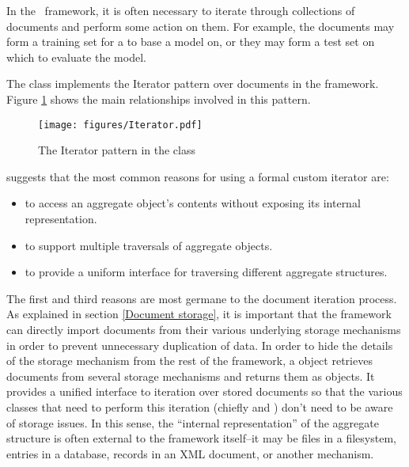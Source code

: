 In the \aicat\ framework, it is often necessary to iterate
through collections of documents and perform some action on them.  For
example, the documents may form a training set for a  to base a
model on, or they may form a test set on which to evaluate the model.

The  class implements the Iterator pattern
\cite[p. 257]{gamma:95} over documents in the framework.  Figure
\ref{Iterator-collection} shows the main relationships involved in
this pattern.

\begin{figure}
\texttt{[image: figures/Iterator.pdf]}
\caption{The Iterator pattern in the  class}
\label{Iterator-collection}
\end{figure}


\cite[p. 259]{gamma:95} suggests that the most common reasons for
using a formal custom iterator are:

\begin{itemize}

\item to access an aggregate object's contents without exposing its
internal representation.

\item to support multiple traversals of aggregate objects.

\item to provide a uniform interface for traversing different
aggregate structures.

\end{itemize}

The first and third reasons are most germane to the document iteration
process.  As explained in section \ref{Document storage}, it is
important that the framework can directly import documents from their
various underlying storage mechanisms in order to prevent unnecessary
duplication of data.  In order to hide the details of the storage
mechanism from the rest of the framework, a  object
retrieves documents from several storage mechanisms and returns them
as  objects.  It provides a unified interface to iteration
over stored documents so that the various classes that need to perform
this iteration (chiefly  and ) don't need to be
aware of storage issues.  In this sense, the ``internal
representation'' of the aggregate structure is often external to the
framework itself--it may be files in a filesystem, entries in a
database, records in an XML document, or another mechanism.

